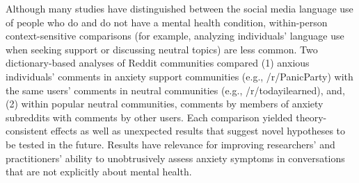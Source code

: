 Although many studies have distinguished between the social media language use of people who do and do not have a mental health condition, within-person context-sensitive comparisons (for example, analyzing individuals' language use when seeking support or discussing neutral topics) are less common. Two dictionary-based analyses of Reddit communities compared (1) anxious individuals' comments in anxiety support communities (e.g., /r/PanicParty) with the same users' comments in neutral communities (e.g., /r/todayilearned), and, (2) within popular neutral communities, comments by members of anxiety subreddits with comments by other users. Each comparison yielded theory-consistent effects as well as unexpected results that suggest novel hypotheses to be tested in the future. Results have relevance for improving researchers' and practitioners' ability to unobtrusively assess anxiety symptoms in conversations that are not explicitly about mental health.
